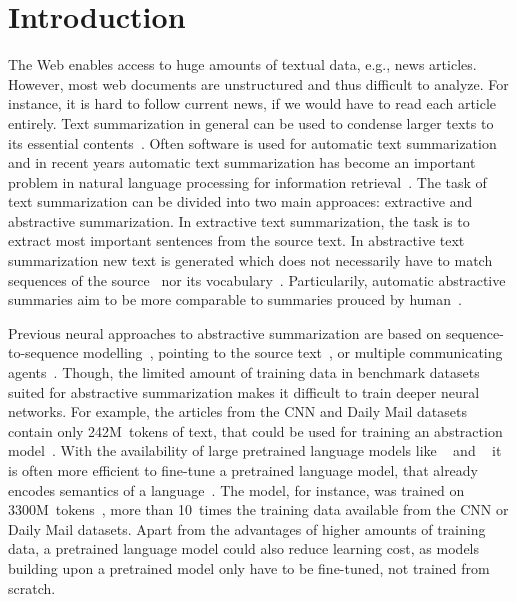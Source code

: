 \section{Introduction} %

The Web enables access to huge amounts of textual data, e.g., news articles.
However, most web documents are unstructured and thus difficult to analyze.
For instance, it is hard to follow current news, if we would have to read each article entirely.
Text summarization in general can be used to condense larger texts to its essential contents~\cite[xix]{Torres-Moreno2014}.
Often software is used for automatic text summarization and in recent years
automatic text summarization has become an important problem in natural language processing for information retrieval~\cite[xxi]{Torres-Moreno2014}.
The task of text summarization can be divided into two main approaces: extractive and abstractive summarization. In extractive text summarization, the task is to extract most important sentences from the source text. In abstractive text summarization new text is generated which does not necessarily have to match sequences of the source~\cite[28]{Torres-Moreno2014} nor its vocabulary~\cite{NallapatiZSGX2016}.
Particularily, automatic abstractive summaries aim to be more comparable to summaries prouced by human~\cite[220]{Torres-Moreno2014}.

Previous neural approaches to abstractive summarization are based on sequence-to-sequence modelling~\cite{NallapatiZSGX2016}, pointing to the source text~\cite{SeeLM2017}, or multiple communicating agents~\cite{CelikyilmazBHC2018}.
Though, the limited amount of training data in benchmark datasets suited for abstractive summarization makes it difficult to train deeper neural networks.
For example, the articles from the CNN and Daily Mail datasets contain only 242M~tokens of text, that could be used for training an abstraction model~\cite{HermannKGEKSB2015}.
With the availability of large pretrained language models like \Elmo~\cite{PetersNIGCLZ2018} and \Bert~\cite{DevlinCLT2019} it is often more efficient to fine-tune a pretrained language model, that already encodes semantics of a language~\cite{LiuL2019}.
The \Bert model, for instance, was trained on 3300M~tokens~\cite{DevlinCLT2019}, more than 10~times the training data available from the CNN or Daily Mail datasets.
Apart from the advantages of higher amounts of training data, a pretrained language model could also reduce learning cost, as models building upon a pretrained model only have to be fine-tuned, not trained from scratch.

